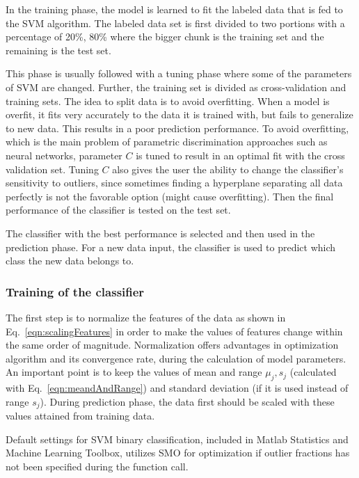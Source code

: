In the training phase, the model is learned to fit the labeled data that is fed to the SVM algorithm. The labeled data set is first divided to two portions with a percentage of 20\%, 80\% where the bigger chunk is the training set and the remaining is the test set. 

This phase is usually followed with a tuning phase where some of the parameters of SVM are changed. Further, the training set is divided as cross-validation and training sets. The idea to split data is to avoid overfitting. When a model is overfit, it fits very accurately to the data it is trained with, but fails to generalize to new data. This results in a poor prediction performance. To avoid overfitting, which is the main problem of parametric discrimination approaches such as neural networks, parameter $C$ is tuned to result in an optimal fit with the cross validation set. Tuning $C$ also gives the user the ability to change the classifier's sensitivity to outliers, since sometimes finding a hyperplane separating all data perfectly is not the favorable option (might cause overfitting). Then the final performance of the classifier is tested on the test set. 

The classifier with the best performance is selected and then used in the prediction phase.  
For a new data input, the classifier is used to predict which class the new data belongs to.



\subsubsection{Training of the classifier}

The first step is to normalize the features of the data as shown in Eq.~\ref{eqn:scalingFeatures} in order to make the values of features change within the same order of magnitude. 
Normalization offers advantages in optimization algorithm and its convergence rate, during the calculation of model parameters.  
An important point is to keep the values of mean and range $\mu_j, s_j$ (calculated with Eq.~\ref{eqn:meandAndRange}) and standard deviation (if it is used instead of range $s_j$). 
During prediction phase, the data first should be scaled with these values attained from training data.

Default settings for SVM binary classification, included in Matlab Statistics and Machine Learning Toolbox, utilizes SMO for optimization if outlier fractions has not been specified during the function call. 

